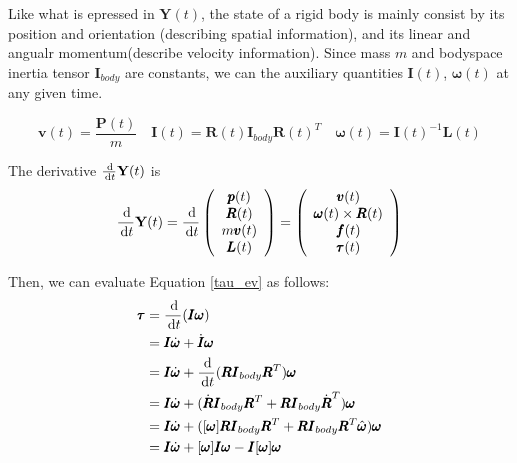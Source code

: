 Like what is epressed in $\textbf{Y}(t)$, the state of a rigid body is mainly consist by its position and orientation (describing spatial information), and its linear and angualr momentum(describe velocity information). Since mass $m$ and bodyspace inertia tensor $\pmb{I}_{body}$ are constants, we can the auxiliary quantities $\pmb{I}(t)$, $\pmb{\omega}(t)$ at any given time.

\begin{equation}
    \pmb{v}(t) = \frac{\pmb{P}(t)}{m} \quad
    \pmb{I}(t) = \pmb{R}(t)\pmb{I}_{body}\pmb{R}(t)^{T} \quad
    \pmb{\omega}(t) = \pmb{I}(t)^{-1}\pmb{L}(t)
\end{equation}

The derivative $\frac{\,\mathrm{d}}{\,\mathrm{d} t}\textbf{Y}(t)$ is
\begin{equation}
    \frac{\,\mathrm{d}}{\,\mathrm{d}{t}}\textbf{Y}(t) = \frac{\,\mathrm{d}}{\,\mathrm{d} t}\left(
        \begin{array}{c}
            \pmb{p}(t) \\
            \pmb{R}(t) \\
            m \pmb{v}(t) \\
            \pmb{L}(t) \\
        \end{array}
    \right) = \left(
        \begin{array}{c}
            \pmb{v}(t) \\
            \pmb{\omega}(t)\times\pmb{R}(t) \\
            \pmb{f}(t) \\
            \pmb{\tau}(t) \\
        \end{array}
    \right)
\end{equation}

Then, we can evaluate Equation \ref{tau_ev} as follows:
\begin{equation}
    \begin{aligned}
        \pmb{\tau} &= \frac{\,\mathrm{d}}{\,\mathrm{d} t}(\pmb{I}\pmb{\omega}) \\
        &= \pmb{I}\dot{\pmb{\omega}} + \dot{\pmb{I}}\pmb{\omega} \\
        &= \pmb{I}\dot{\pmb{\omega}} + \frac{\,\mathrm{d}}{\,\mathrm{d} t}(\pmb{R}\pmb{I}_{body}\pmb{R}^{T})\pmb{\omega} \\
        &= \pmb{I}\dot{\pmb{\omega}} + (\dot{\pmb{R}}\pmb{I}_{body}\pmb{R}^{T} + \pmb{R}\pmb{I}_{body}\dot{\pmb{R}}^{T})\pmb{\omega} \\
        &= \pmb{I}\dot{\pmb{\omega}} + ([\pmb{\omega}]\pmb{R}\pmb{I}_{body}\pmb{R}^{T} + \pmb{R}\pmb{I}_{body}\pmb{R}^{T} \hat{\pmb{\omega}})\pmb{\omega} \\
        &= \pmb{I}\dot{\pmb{\omega}} + [\pmb{\omega}]\pmb{I}\pmb{\omega} - \pmb{I}[\pmb{\omega}]\pmb{\omega}
    \end{aligned}
    \label{tau_ev}
\end{equation}

